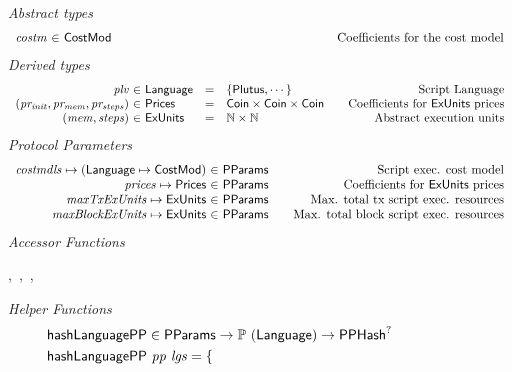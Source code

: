 \begin{figure*}[htb]
  \emph{Abstract types}
  \begin{equation*}
    \begin{array}{r@{~\in~}l@{\qquad\qquad\qquad\qquad\qquad\qquad\qquad\qquad\qquad}r}
      \var{costm} & \CostMod & \text{Coefficients for the cost model} \\
    \end{array}
  \end{equation*}
  \emph{Derived types}
  \begin{equation*}
    \begin{array}{r@{~\in~}l@{\quad=\quad}l@{\qquad}r}
      \var{plv}
      & \Language
      & \{\Plutus, \dotsb\}
      & \text{Script Language}
      \\
      \var{(pr_{init}, pr_{mem}, pr_{steps})}
      & \Prices
      & \Coin \times \Coin \times \Coin
      & \text {Coefficients for $\ExUnits$ prices}
      \\
      \var{(mem, steps)}
      & \ExUnits
      & \N \times \N
      & \text{Abstract execution units} \\
    \end{array}
  \end{equation*}
  \emph{Protocol Parameters}
  \begin{equation*}
      \begin{array}{r@{~\in~}l@{\qquad}r}
        \var{costmdls} \mapsto (\Language \mapsto \CostMod) & \PParams & \text{Script exec. cost model}\\
        \var{prices} \mapsto \Prices & \PParams & \text{Coefficients for $\ExUnits$ prices} \\
        \var{maxTxExUnits} \mapsto \ExUnits & \PParams & \text{Max. total tx script exec. resources}\\
        \var{maxBlockExUnits} \mapsto \ExUnits & \PParams & \text{Max. total block script exec. resources}\\
      \end{array}
  \end{equation*}
  \emph{Accessor Functions}
  \begin{center}
  ,~,~,~
  \end{center}
  \emph{Helper Functions}
  \begin{align*}
    & \mathsf{hashLanguagePP} \in \mathsf{PParams} \to \mathbb{P}~(\mathsf{Language}) \to \mathsf{PPHash}^?   \\
    & \mathsf{hashLanguagePP}~\mathit{pp}~\mathit{lgs} = \begin{cases}

\end{cases}
\end{align*}
\end{figure*}
